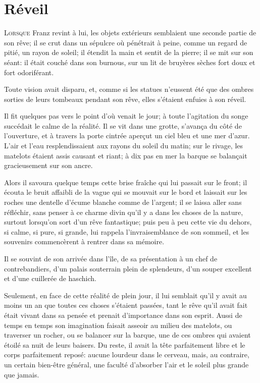 \chapter{Réveil}

\lettrine{L}{orsque} Franz revint à lui, les objets extérieurs semblaient une seconde partie de son rêve; il se crut dans un sépulcre où pénétrait à peine, comme un regard de pitié, un rayon de soleil; il étendit la main et sentit de la pierre; il se mit sur son séant: il était couché dans son burnous, sur un lit de bruyères sèches fort doux et fort odoriférant. 

Toute vision avait disparu, et, comme si les statues n'eussent été que des ombres sorties de leurs tombeaux pendant son rêve, elles s'étaient enfuies à son réveil. 

Il fit quelques pas vers le point d'où venait le jour; à toute l'agitation du songe succédait le calme de la réalité. Il se vit dans une grotte, s'avança du côté de l'ouverture, et à travers la porte cintrée aperçut un ciel bleu et une mer d'azur. L'air et l'eau resplendissaient aux rayons du soleil du matin; sur le rivage, les matelots étaient assis causant et riant; à dix pas en mer la barque se balançait gracieusement sur son ancre. 

Alors il savoura quelque temps cette brise fraîche qui lui passait sur le front; il écouta le bruit affaibli de la vague qui se mouvait sur le bord et laissait sur les roches une dentelle d'écume blanche comme de l'argent; il se laissa aller sans réfléchir, sans penser à ce charme divin qu'il y a dans les choses de la nature, surtout lorsqu'on sort d'un rêve fantastique; puis peu à peu cette vie du dehors, si calme, si pure, si grande, lui rappela l'invraisemblance de son sommeil, et les souvenirs commencèrent à rentrer dans sa mémoire. 

Il se souvint de son arrivée dans l'île, de sa présentation à un chef de contrebandiers, d'un palais souterrain plein de splendeurs, d'un souper excellent et d'une cuillerée de haschich. 

Seulement, en face de cette réalité de plein jour, il lui semblait qu'il y avait au moins un an que toutes ces choses s'étaient passées, tant le rêve qu'il avait fait était vivant dans sa pensée et prenait d'importance dans son esprit. Aussi de temps en temps son imagination faisait asseoir au milieu des matelots, ou traverser un rocher, ou se balancer sur la barque, une de ces ombres qui avaient étoilé sa nuit de leurs baisers. Du reste, il avait la tête parfaitement libre et le corps parfaitement reposé: aucune lourdeur dans le cerveau, mais, au contraire, un certain bien-être général, une faculté d'absorber l'air et le soleil plus grande que jamais. 

